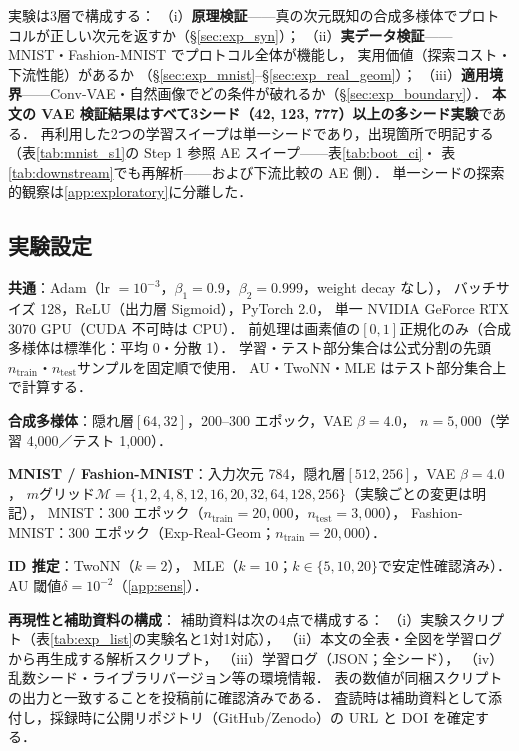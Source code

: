 \documentclass[11pt,a4paper]{jsarticle}
\begin{document}
実験は3層で構成する：
（i）\textbf{原理検証}——真の次元既知の合成多様体でプロトコルが正しい次元を返すか（§\ref{sec:exp_syn}）；
（ii）\textbf{実データ検証}——MNIST・Fashion-MNIST でプロトコル全体が機能し，
実用価値（探索コスト・下流性能）があるか
（§\ref{sec:exp_mnist}--§\ref{sec:exp_real_geom}）；
（iii）\textbf{適用境界}——Conv-VAE・自然画像でどの条件が破れるか（§\ref{sec:exp_boundary}）．
\textbf{本文の VAE 検証結果はすべて3シード（42, 123, 777）以上の多シード実験}である．
再利用した2つの学習スイープは単一シードであり，出現箇所で明記する
（表\ref{tab:mnist_s1}の Step 1 参照 AE スイープ——表\ref{tab:boot_ci}・
表\ref{tab:downstream}でも再解析——および下流比較の AE 側）．
単一シードの探索的観察は\ref{app:exploratory}に分離した．

\subsection{実験設定}\label{sec:exp_setup}

\textbf{共通}：Adam（lr $= 10^{-3}$，$\beta_1 = 0.9$，$\beta_2 = 0.999$，weight decay なし），
バッチサイズ 128，ReLU（出力層 Sigmoid），PyTorch 2.0，
単一 NVIDIA GeForce RTX 3070 GPU（CUDA 不可時は CPU）．
前処理は画素値の$[0,1]$正規化のみ（合成多様体は標準化：平均 0・分散 1）．
学習・テスト部分集合は公式分割の先頭$n_{\mathrm{train}}$・$n_{\mathrm{test}}$サンプルを固定順で使用．
AU・TwoNN・MLE はテスト部分集合上で計算する．

\textbf{合成多様体}：隠れ層$[64, 32]$，200--300 エポック，VAE $\beta = 4.0$，
$n = 5{,}000$（学習 4,000／テスト 1,000）．

\textbf{MNIST / Fashion-MNIST}：入力次元 784，隠れ層$[512, 256]$，VAE $\beta = 4.0$，
$m$グリッド$\mathcal{M} = \{1, 2, 4, 8, 12, 16, 20, 32, 64, 128, 256\}$（実験ごとの変更は明記），
MNIST：300 エポック（$n_{\mathrm{train}} = 20{,}000$，$n_{\mathrm{test}} = 3{,}000$），
Fashion-MNIST：300 エポック（Exp-Real-Geom；$n_{\mathrm{train}} = 20{,}000$）．

\textbf{ID 推定}：TwoNN（$k = 2$）\cite{facco2017twonn}，
MLE（$k = 10$；$k \in \{5, 10, 20\}$で安定性確認済み）\cite{levina2005mle}．
AU 閾値$\delta = 10^{-2}$（\ref{app:sens}）．

\textbf{再現性と補助資料の構成}：
補助資料は次の4点で構成する：
（i）実験スクリプト（表\ref{tab:exp_list}の実験名と1対1対応），
（ii）本文の全表・全図を学習ログから再生成する解析スクリプト，
（iii）学習ログ（JSON；全シード），
（iv）乱数シード・ライブラリバージョン等の環境情報．
表の数値が同梱スクリプトの出力と一致することを投稿前に確認済みである．
査読時は補助資料として添付し，採録時に公開リポジトリ（GitHub/Zenodo）の
URL と DOI を確定する．
\end{document}
